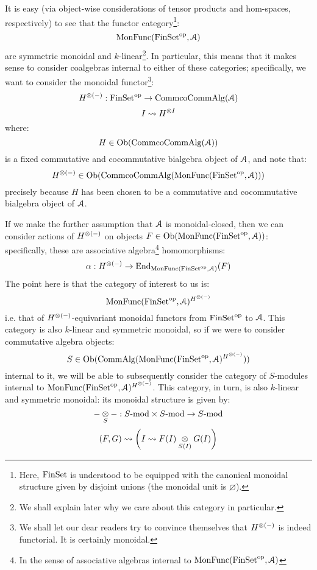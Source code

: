             \begin{remark}
                It is easy (via object-wise considerations of tensor products and hom-spaces, respectively) to see that the functor category\footnote{Here, $\mathrm{Fin}\mathrm{Set}$ is understood to be equipped with the canonical monoidal structure given by disjoint unions (the monoidal unit is $\varnothing$).}:
                    $$\mathrm{Mon}\mathrm{Func}(\mathrm{Fin}\mathrm{Set}^{\mathrm{op}}, \mathcal{A})$$
                are symmetric monoidal and $k$-linear\footnote{We shall explain later why we care about this category in particular.}. In particular, this means that it makes sense to consider coalgebras internal to either of these categories; specifically, we want to consider the monoidal functor\footnote{We shall let our dear readers try to convince themselves that $H^{\tensor (-)}$ is indeed functorial. It is certainly monoidal.}:
                    $$H^{\tensor (-)}: \Fin\Sets^{\op} \to \Comm\co\Comm\Alg(\calA)$$
                    $$I \mapsto H^{\tensor I}$$
                where:
                    $$H \in \mathrm{Ob}(\mathrm{Comm}\mathrm{co}\mathrm{Comm}\mathrm{Alg}(\mathcal{A}))$$
                is a fixed commutative and cocommutative bialgebra object of $\mathcal{A}$, and note that:
                    $$H^{\tensor (-)} \in \Ob(\Comm\co\Comm\Alg(\Mon\Func(\Fin\Sets^{\op}, \calA)))$$
                precisely because $H$ has been chosen to be a commutative and cocommutative bialgebra object of $\mathcal{A}$. 
                
                If we make the further assumption that $\mathcal{A}$ is monoidal-closed, then we can consider actions of $H^{\tensor (-)}$ on objects $F \in \mathrm{Ob}(\mathrm{Mon}\mathrm{Func}(\mathrm{Fin}\mathrm{Set}^{\mathrm{op}}, \mathcal{A}))$: specifically, these are associative algebra\footnote{In the sense of associative algebras internal to $\mathrm{Mon}\mathrm{Func}(\mathrm{Fin}\mathrm{Set}^{\mathrm{op}}, \mathcal{A})$} homomorphisms:
                    $$\alpha: H^{\tensor (-)} \to \End_{\Mon\Func(\Fin\Sets^{\op}, \calA)}(F)$$
                The point here is that the category of interest to us is:
                    $$\Mon\Func(\Fin\Sets^{\op}, \calA)^{H^{\tensor (-)}}$$
                i.e. that of $H^{\tensor (-)}$-equivariant monoidal functors from $\mathrm{Fin}\mathrm{Set}^{\mathrm{op}}$ to $\mathcal{A}$. This category is also $k$-linear and symmetric monoidal, so if we were to consider commutative algebra objects:
                    $$S \in \Ob(\Comm\Alg(\Mon\Func(\Fin\Sets^{\op}, \calA)^{H^{\tensor (-)}}))$$
                internal to it, we will be able to subsequently consider the category of $S$-modules internal to $\Mon\Func(\Fin\Sets^{\op}, \calA)^{H^{\tensor (-)}}$. This category, in turn, is also $k$-linear and symmetric monoidal: its monoidal structure is given by:
                    $$- \tensor_S -: S\mod \x S\mod \to S\mod$$
                    $$(F, G) \mapsto \left(I \mapsto F(I) \tensor_{S(I)} G(I)\right)$$
            \end{remark}
